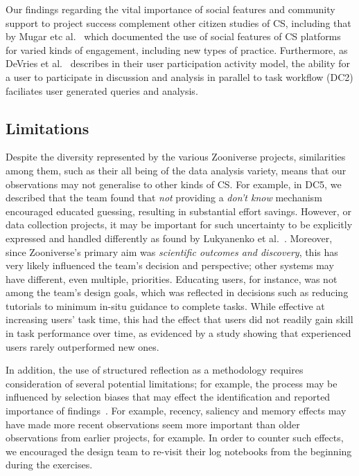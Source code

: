 \documentclass{sigchi}
\begin{document}
\begin{spacing}{0.97}

Our findings regarding the vital importance of social features and community support to project success complement other citizen studies of CS, including that by Mugar etc al.~\cite{Mugar2014PH} which documented the use of social features of CS platforms for varied kinds of engagement, including new types of practice. Furthermore, as DeVries et al.~\cite{DeVries2013} describes in their user participation activity model, the ability for a user to participate in discussion and analysis in parallel to task workflow (DC2) faciliates user generated queries and analysis.


\subsection{Limitations}

Despite the diversity represented by the various Zooniverse projects, similarities among them, such as their all being of the data analysis variety, means that our observations may not generalise to other kinds of CS. For example, in DC5, we described that the team found that \emph{not} providing a \emph{don't know} mechanism encouraged educated guessing, resulting in substantial effort savings. However, or data collection projects, it may be important for such uncertainty to be explicitly expressed and handled differently as found by Lukyanenko et al.~\cite{Lukyanenko2014}. Moreover, since Zooniverse's primary aim was \emph{scientific outcomes and discovery}, this has very likely influenced the team's decision and perspective; other systems may have different, even multiple, priorities. Educating users, for instance, was not among the team's design goals, which was reflected in decisions such as reducing tutorials to minimum in-situ guidance to complete tasks. While effective at increasing users' task time, this had the effect that users did not readily gain skill in task performance over time, as evidenced by a study showing that experienced users rarely outperformed new ones. 

In addition, the use of structured reflection as a methodology requires consideration of several potential limitations; for example, the process may be influenced by selection biases that may effect the identification and reported importance of findings~\cite{Hilliard2006}. For example, recency, saliency and memory effects may have made more recent observations seem more important than older observations from earlier projects, for example. In order to counter such effects, we encouraged the design team to re-visit their log notebooks from the beginning during the exercises.


\end{spacing}
\end{document}
